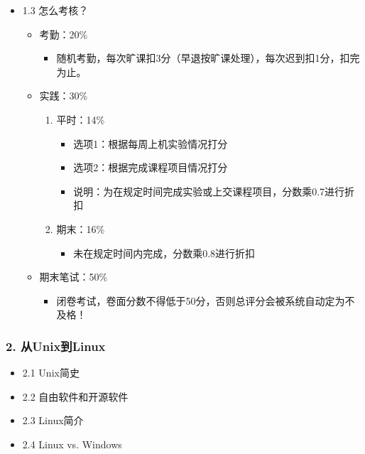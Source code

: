 \documentclass[bigger]{beamer}
\begin{document}
\begin{frame}[fragile]
\begin{itemize}
\item 1.3 怎么考核？
\label{sec-1-1-3}%
\begin{itemize}
\item 考勤：20\%
\begin{itemize}
\item 随机考勤，每次旷课扣3分（早退按旷课处理），每次迟到扣1分，扣完为止。
\end{itemize}
\item 实践：30\%
\begin{enumerate}
\item 平时：14\%
\begin{itemize}
\item 选项1：根据每周上机实验情况打分
\item 选项2：根据完成课程项目情况打分
\item 说明：为在规定时间完成实验或上交课程项目，分数乘0.7进行折扣
\end{itemize}
\item 期末：16\%
\begin{itemize}
\item 未在规定时间内完成，分数乘0.8进行折扣
\end{itemize}
\end{enumerate}
\item 期末笔试：50\%
\begin{itemize}
\item 闭卷考试，卷面分数不得低于50分，否则总评分会被系统自动定为不及格！
\end{itemize}
\end{itemize}
\end{itemize} %
\end{frame}
\begin{frame}
\frametitle{2. 从Unix到Linux}
\label{sec-1-2}
\begin{itemize}

\item 2.1 Unix简史
\label{sec-1-2-1}%

\item 2.2 自由软件和开源软件
\label{sec-1-2-2}%

\item 2.3 Linux简介
\label{sec-1-2-3}%

\item 2.4 Linux vs. Windows
\label{sec-1-2-4}%
\end{itemize} %
\end{frame}
\end{document}
